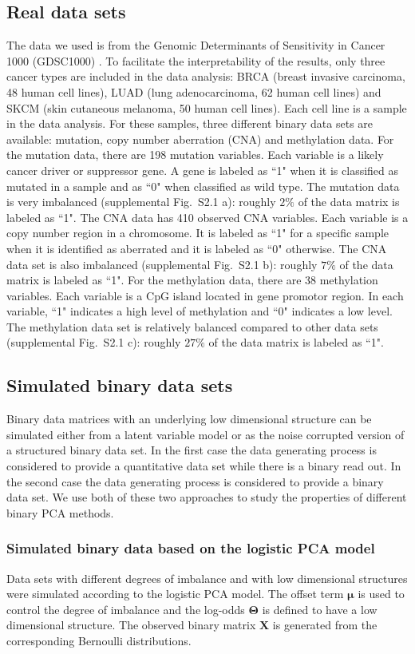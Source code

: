 \subsection{Real data sets}
The data we used is from the Genomic Determinants of Sensitivity in Cancer 1000 (GDSC1000) \cite{iorio2016landscape}. To facilitate the interpretability of the results, only three cancer types are included in the data analysis: BRCA (breast invasive carcinoma, 48 human cell lines), LUAD (lung adenocarcinoma, 62 human cell lines) and SKCM (skin cutaneous melanoma, 50 human cell lines). Each cell line is a sample in the data analysis. For these samples, three different binary data sets are available: mutation, copy number aberration (CNA) and methylation data. For the mutation data, there are 198 mutation variables. Each variable is a likely cancer driver or suppressor gene. A gene is labeled as ``1" when it is classified as mutated in a sample and as ``0" when classified as wild type. The mutation data is very imbalanced (supplemental Fig.~S2.1 a): roughly $2\%$ of the data matrix is labeled as ``1". The CNA data has 410 observed CNA variables. Each variable is a copy number region in a chromosome. It is labeled as ``1" for a specific sample when it is identified as aberrated and it is labeled as ``0" otherwise. The CNA data set is also imbalanced (supplemental Fig.~S2.1 b): roughly $7\%$ of the data matrix is labeled as ``1". For the methylation data, there are 38 methylation variables. Each variable is a CpG island located in gene promotor region. In each variable, ``1" indicates a high level of methylation and ``0" indicates a low level. The methylation data set is relatively balanced compared to other data sets (supplemental Fig.~S2.1 c): roughly $27\%$ of the data matrix is labeled as ``1".

\subsection{Simulated binary data sets}
Binary data matrices with an underlying low dimensional structure can be simulated either from a latent variable model or as the noise corrupted version of a structured binary data set. In the first case the data generating process is considered to provide a quantitative data set while there is a binary read out. In the second case the data generating process is considered to provide a binary data set. We use both of these two approaches to study the properties of different binary PCA methods.

\subsubsection{Simulated binary data based on the logistic PCA model}
Data sets with different degrees of imbalance and with low dimensional structures were simulated according to the logistic PCA model. The offset term $\bm{\mu}$ is used to control the degree of imbalance and the log-odds $\mathbf{\Theta}$ is defined to have a low dimensional structure. The observed binary matrix $\mathbf{X}$ is generated from the corresponding Bernoulli distributions.

